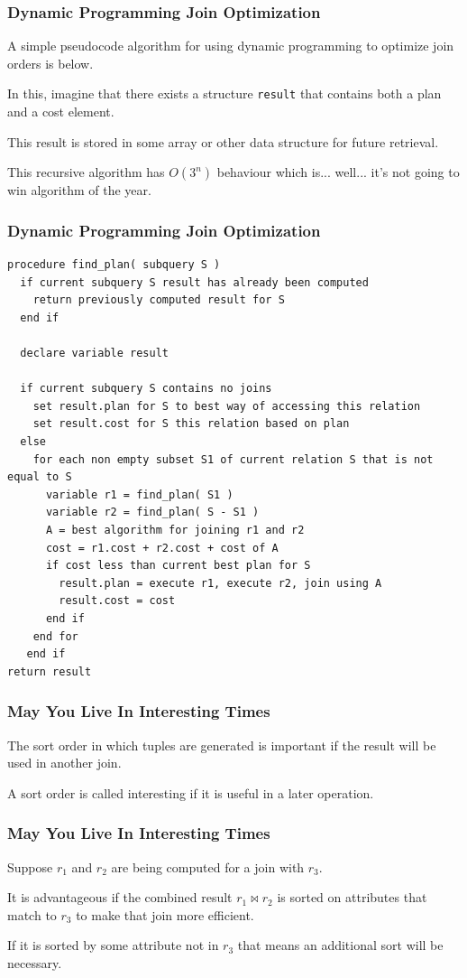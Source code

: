 \begin{frame}
\frametitle{Dynamic Programming Join Optimization}

A simple pseudocode algorithm for using dynamic programming to optimize join orders is below. 

In this, imagine that there exists a structure \texttt{result} that contains both a plan and a cost element. 

This result is stored in some array or other data structure for future retrieval. 

This recursive algorithm has $O(3^{n})$ behaviour which is... well... it's not going to win algorithm of the year.


\end{frame}


\begin{frame}[fragile]
\frametitle{Dynamic Programming Join Optimization}
{\scriptsize
\begin{verbatim}
procedure find_plan( subquery S ) 
  if current subquery S result has already been computed
    return previously computed result for S
  end if

  declare variable result

  if current subquery S contains no joins
    set result.plan for S to best way of accessing this relation
    set result.cost for S this relation based on plan
  else 
    for each non empty subset S1 of current relation S that is not equal to S
      variable r1 = find_plan( S1 ) 
      variable r2 = find_plan( S - S1 )
      A = best algorithm for joining r1 and r2
      cost = r1.cost + r2.cost + cost of A
      if cost less than current best plan for S
        result.plan = execute r1, execute r2, join using A
        result.cost = cost
      end if  
    end for
   end if
return result
\end{verbatim}
}

\end{frame}

\begin{frame}
\frametitle{May You Live In Interesting Times}

The sort order in which tuples are generated is important if the result will be used in another join. 

A sort order is called \alert{interesting} if it is useful in a later operation. 


\end{frame}

\begin{frame}
\frametitle{May You Live In Interesting Times}

Suppose $r_{1}$ and $r_{2}$ are being computed for a join with $r_{3}$.

It is advantageous if the combined result $r_{1} \bowtie r_{2}$ is sorted on attributes that match to $r_{3}$ to make that join more efficient.

If it is sorted by some attribute not in $r_{3}$ that means an additional sort will be necessary.

\end{frame}

